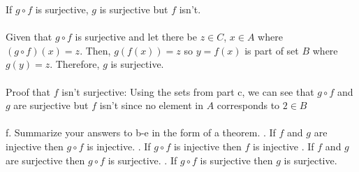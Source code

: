 \documentclass[]{article}
\begin{document}
\begin{enumerate}
    \newline If $g \circ f$ is surjective, $g$ is surjective but $f$ isn't.
    \\\\ Given that $g \circ f$ is surjective and let there be $z \in C$, $x \in A$ where $(g \circ f)(x)=z$. Then, $g(f(x))=z$ so $y=f(x)$ is part of set $B$ where $g(y)=z$. Therefore, $g$ is surjective.
    \\\\ Proof that $f$ isn't surjective:
    \newline Using the sets from part c, we can see that $g \circ f$ and $g$ are surjective but $f$ isn't since no element in $A$ corresponds to $2 \in B$
    \\\\f. Summarize your answers to b-e in the form of a theorem.
    . If $f$ and $g$ are injective then  $g \circ f$ is injective.
    . If $g \circ f$ is injective then $f$ is injective
    . If $f$ and $g$ are surjective then $g \circ f$ is surjective.
    . If $g \circ f$ is surjective then $g$ is surjective.
    

\end{enumerate}
\end{document}
